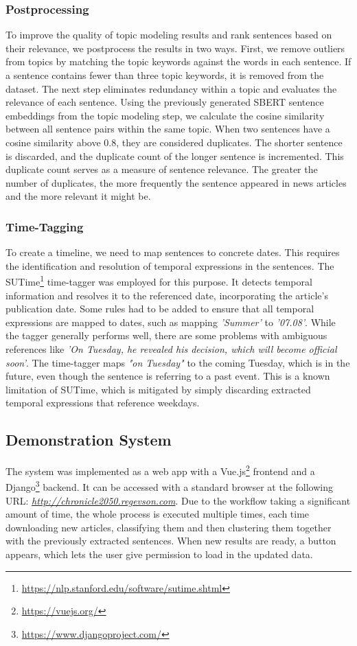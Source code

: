 \documentclass[sigconf]{acmart}
\begin{document}
\subsubsection{Postprocessing}
To improve the quality of topic modeling results and rank sentences based on their relevance, we postprocess the results in two ways.
First, we remove outliers from topics by matching the topic keywords against the words in each sentence. If a sentence contains fewer than three topic keywords, it is removed from the dataset.
The next step eliminates redundancy within a topic and evaluates the relevance of each sentence. Using the previously generated SBERT sentence embeddings from the topic modeling step, we calculate the cosine similarity between all sentence pairs within the same topic. When two sentences have a cosine similarity above 0.8, they are considered duplicates. The shorter sentence is discarded, and the duplicate count of the longer sentence is incremented. This duplicate count serves as a measure of sentence relevance. The greater the number of duplicates, the more frequently the sentence appeared in news articles and the more relevant it might be.

\subsubsection{Time-Tagging}
To create a timeline, we need to map sentences to concrete dates. This requires the identification and resolution of temporal expressions in the sentences. The SUTime\footnote{\url{https://nlp.stanford.edu/software/sutime.shtml}} time-tagger was employed for this purpose. It detects temporal information and resolves it to the referenced date, incorporating the article's publication date.
Some rules had to be added to ensure that all temporal expressions are mapped to dates, such as mapping \textit{'Summer'} to \textit{'07.08'}.
While the tagger generally performs well, there are some problems with ambiguous references like \textit{'On Tuesday, he revealed his decision, which will become official soon'}.
The time-tagger maps \textit{"on Tuesday"} to the coming Tuesday, which is in the future, even though the sentence is referring to a past event. This is a known limitation of SUTime, which is mitigated by simply discarding extracted temporal expressions that reference weekdays.

\subsection{Demonstration System}
The system was implemented as a web app with a Vue.js\footnote{\url{https://vuejs.org/}} frontend and a Django\footnote{\url{https://www.djangoproject.com/}} backend. It can be accessed with a standard browser at the following URL: \textit{\url{http://chronicle2050.regevson.com}}. Due to the workflow taking a significant amount of time, the whole process is executed multiple times, each time downloading new articles, classifying them and then clustering them together with the previously extracted sentences. When new results are ready, a button appears, which lets the user give permission to load in the updated data.
\end{document}
